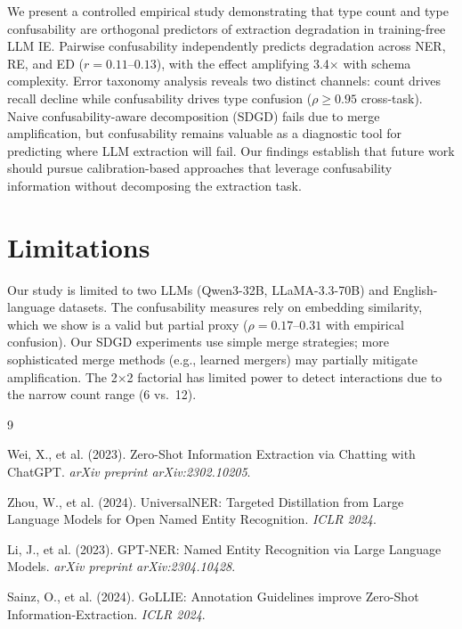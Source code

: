 \documentclass[11pt,a4paper]{article}
\begin{document}
We present a controlled empirical study demonstrating that type count and type confusability are orthogonal predictors of extraction degradation in training-free LLM IE.
Pairwise confusability independently predicts degradation across NER, RE, and ED ($r{=}0.11$--$0.13$), with the effect amplifying 3.4$\times$ with schema complexity.
Error taxonomy analysis reveals two distinct channels: count drives recall decline while confusability drives type confusion ($\rho{\geq}0.95$ cross-task).
Naive confusability-aware decomposition (SDGD) fails due to merge amplification, but confusability remains valuable as a diagnostic tool for predicting where LLM extraction will fail.
Our findings establish that future work should pursue calibration-based approaches that leverage confusability information without decomposing the extraction task.

\section*{Limitations}

Our study is limited to two LLMs (Qwen3-32B, LLaMA-3.3-70B) and English-language datasets.
The confusability measures rely on embedding similarity, which we show is a valid but partial proxy ($\rho{=}0.17$--$0.31$ with empirical confusion).
Our SDGD experiments use simple merge strategies; more sophisticated merge methods (e.g., learned mergers) may partially mitigate amplification.
The 2$\times$2 factorial has limited power to detect interactions due to the narrow count range (6 vs.\ 12).

\begin{thebibliography}{9}

Wei, X., et al. (2023).
Zero-Shot Information Extraction via Chatting with ChatGPT.
\emph{arXiv preprint arXiv:2302.10205}.

Zhou, W., et al. (2024).
UniversalNER: Targeted Distillation from Large Language Models for Open Named Entity Recognition.
\emph{ICLR 2024}.

Li, J., et al. (2023).
GPT-NER: Named Entity Recognition via Large Language Models.
\emph{arXiv preprint arXiv:2304.10428}.

Sainz, O., et al. (2024).
GoLLIE: Annotation Guidelines improve Zero-Shot Information-Extraction.
\emph{ICLR 2024}.

\end{thebibliography}
\end{document}
